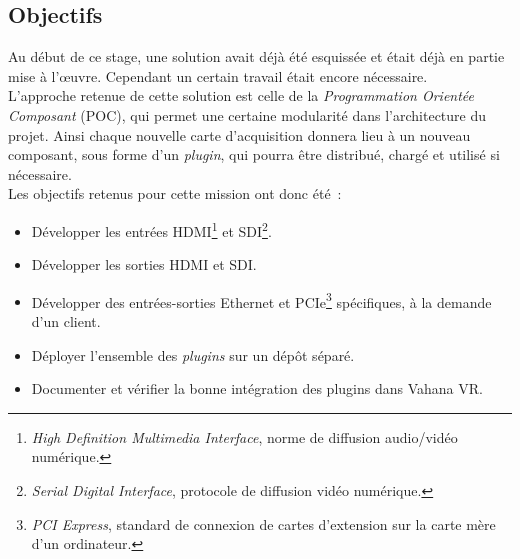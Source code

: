 \subsection{Objectifs}
Au début de ce stage, une solution avait déjà été esquissée et était déjà en partie
mise à l'\oe uvre. Cependant un certain travail était encore nécessaire.\\
L'approche retenue de cette solution est celle de la \emph{Programmation Orientée Composant} (POC),
qui permet une certaine modularité dans l'architecture du projet\cite{poc}. Ainsi chaque nouvelle
carte d'acquisition donnera lieu à un nouveau composant, sous forme d'un \textit{plugin},
qui pourra être distribué, chargé et utilisé si nécessaire\cite{plugin}.\\
\newline
Les objectifs retenus pour cette mission ont donc été~:
\begin{itemize}
  \item Développer les entrées HDMI\footnote{\textit{High Definition Multimedia Interface}, 
  norme de diffusion audio/vidéo numérique\cite{hdmi}.} et SDI\footnote{\textit{Serial Digital Interface}, 
  protocole de diffusion vidéo numérique\cite{sdi}.}.
  \item Développer les sorties HDMI et SDI.
  \item Développer des entrées-sorties Ethernet et PCIe\footnote{\textit{PCI Express}, standard
  de connexion de cartes d'extension sur la carte mère d'un ordinateur\cite{pci-express}.}
  spécifiques, à la demande d'un client.
  \item Déployer l'ensemble des \textit{plugins} sur un dépôt séparé.
  \item Documenter et vérifier la bonne intégration des plugins dans Vahana VR.
\end{itemize}

